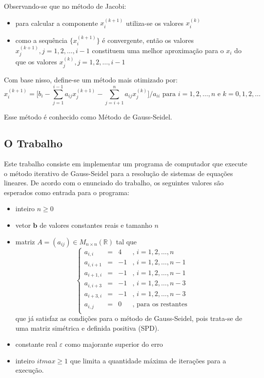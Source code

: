 Observando-se que no método de Jacobi:
	\begin{itemize}
		\item para calcular a componente $x_{i}^{(k+1)}$ utiliza-se os valores $x_{i}^{(k)}$
		\item como a sequência $\{ x_{i}^{(k+1)}\}$ é convergente, então os valores $x_{j}^{(k+1)}, j = 1, 2, \dots, i-1$ constituem uma melhor aproximação para o $x_{i}$ do que os valores $x_{j}^{(k)}, j = 1, 2, \dots, i-1$
	\end{itemize}

Com base nisso, define-se um método mais otimizado por:
	\[
		x_{i}^{(k+1)} = \Big[b_{i} - \sum_{j = 1}^{i - 1}a_{ij}x_{j}^{(k+1)} - \sum_{j = i + 1}^{n}a_{ij}x_{j}^{(k)}\Big] / a_{ii} \text{ para } i = 1, 2, \dots, n \text{ e } k = 0, 1, 2, \dots
	\]

Esse método é conhecido como Método de Gauss-Seidel.

\subsection{O Trabalho}

Este trabalho consiste em implementar um programa de computador que execute o método iterativo de Gauss-Seidel para a resolução de sistemas de equações lineares. De acordo com o enunciado do trabalho, os seguintes valores são esperados como entrada para o programa:

\begin{itemize}
	\item inteiro $n \geq 0$
	\item vetor $\mathbf{b}$ de valores constantes reais e tamanho $n$
	\item matriz $A = (a_{ij}) \in M_{n \times n}(\mathbb{R})$ tal que
	\[
		\left \{
			\begin{array}{llllll}
				a_{i,i}   & = &  4 & \text{, } i = 1, 2, \dots, n\\
				a_{i,i+1} & = & -1 & \text{, } i = 1, 2, \dots, n-1\\
				a_{i+1,i} & = & -1 & \text{, } i = 1, 2, \dots, n-1\\
				a_{i,i+3} & = & -1 & \text{, } i = 1, 2, \dots, n-3\\
				a_{i+3,i} & = & -1 & \text{, } i = 1, 2, \dots, n-3\\
				a_{i,j}   & = &  0 & \text{, para os restantes}\\
			\end{array}
		\right .
	\] que já satisfaz as condições para o método de Gauss-Seidel, pois trata-se de uma matriz simétrica e definida positiva (SPD).
	\item constante real $\varepsilon$ como majorante superior do erro
	\item inteiro $itmax \geq 1$ que limita a quantidade máxima de iterações para a execução.
\end{itemize}


